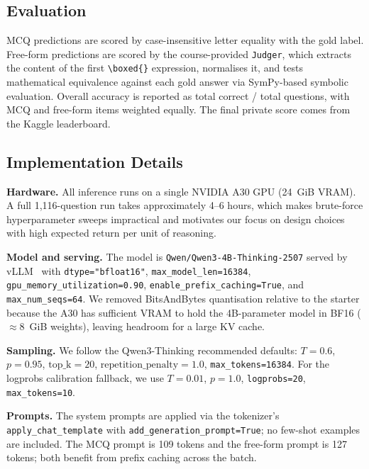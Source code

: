 \documentclass{article}
\begin{document}
\subsection{Evaluation}
\label{sec:evaluation}

MCQ predictions are scored by case-insensitive letter equality with the gold
label.
Free-form predictions are scored by the course-provided \texttt{Judger},
which extracts the content of the first \texttt{\textbackslash boxed\{\}}
expression, normalises it, and tests mathematical equivalence against each
gold answer via SymPy-based symbolic evaluation.
Overall accuracy is reported as total correct / total questions, with MCQ
and free-form items weighted equally.
The final private score comes from the Kaggle leaderboard.

\subsection{Implementation Details}
\label{sec:implementation_details}

\textbf{Hardware.}
All inference runs on a single NVIDIA A30 GPU (24~GiB VRAM).
A full 1,116-question run takes approximately 4--6 hours, which makes
brute-force hyperparameter sweeps impractical and motivates our focus on
design choices with high expected return per unit of reasoning.

\textbf{Model and serving.}
The model is \texttt{Qwen/Qwen3-4B-Thinking-2507} served by vLLM~\citep{vllm}
with \texttt{dtype="bfloat16"}, \texttt{max\_model\_len=16384},
\texttt{gpu\_memory\_utilization=0.90}, \texttt{enable\_prefix\_caching=True},
and \texttt{max\_num\_seqs=64}.
We removed BitsAndBytes quantisation relative to the starter because the A30
has sufficient VRAM to hold the 4B-parameter model in BF16
($\approx$8~GiB weights), leaving headroom for a large KV cache.

\textbf{Sampling.}
We follow the Qwen3-Thinking recommended defaults:
$T{=}0.6$, $p{=}0.95$, $\mathrm{top\_k}{=}20$,
$\mathrm{repetition\_penalty}{=}1.0$, \texttt{max\_tokens=16384}.
For the logprobs calibration fallback, we use $T{=}0.01$, $p{=}1.0$,
\texttt{logprobs=20}, \texttt{max\_tokens=10}.

\textbf{Prompts.}
The system prompts are applied via the tokenizer's
\texttt{apply\_chat\_template} with \texttt{add\_generation\_prompt=True};
no few-shot examples are included.
The MCQ prompt is 109 tokens and the free-form prompt is 127 tokens; both
benefit from prefix caching across the batch.
\end{document}
